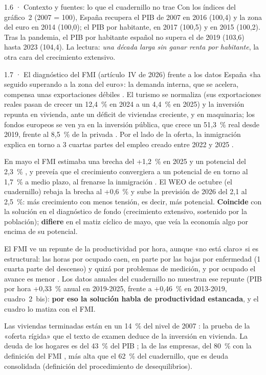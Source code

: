 \begin{complemento}{1.6 · Contexto y fuentes: lo que el cuadernillo no trae}
 Con los índices del gráfico~2 (2007 = 100), España recupera el PIB de 2007 en 2016 (100,4) y la zona del euro en 2014 (100,0); el PIB por habitante, en 2017 (100,5) y en 2015 (100,2). Tras la pandemia, el PIB por habitante español no supera el de 2019 (103,6) hasta 2023 (104,4). La lectura: \emph{una década larga sin ganar renta por habitante}, la otra cara del crecimiento extensivo.
\end{complemento}

\begin{complemento}{1.7 · El diagnóstico del FMI (artículo~IV de 2026) frente a los datos}
 España «ha seguido superando a la zona del euro»: la demanda interna, que se acelera, compensa unas exportaciones débiles . El turismo se normaliza (sus exportaciones reales pasan de crecer un 12,4~\% en 2024 a un 4,4~\% en 2025) y la inversión repunta en vivienda, ante un déficit de viviendas creciente, y en maquinaria; los fondos europeos se ven ya en la inversión pública, que crece un 51,3~\% real desde 2019, frente al 8,5~\% de la privada . Por el lado de la oferta, la inmigración explica en torno a 3 cuartas partes del empleo creado entre 2022 y 2025 .

 En mayo el FMI estimaba una brecha del +1,2~\% en 2025 y un potencial del 2,3~\% , y preveía que el crecimiento convergiera a un potencial de en torno al 1,7~\% a medio plazo, al frenarse la inmigración . El WEO de octubre (el cuadernillo) rebaja la brecha al +0,6~\% y sube la previsión de 2026 del 2,1 al 2,5~\%: más crecimiento con menos tensión, es decir, más potencial. \textbf{Coincide} con la solución en el diagnóstico de fondo (crecimiento extensivo, sostenido por la población); \textbf{difiere} en el matiz cíclico de mayo, que veía la economía algo por encima de su potencial.

 El FMI ve un repunte de la productividad por hora, aunque «no está claro» si es estructural: las horas por ocupado caen, en parte por las bajas por enfermedad (1 cuarta parte del descenso) y quizá por problemas de medición, y por ocupado el avance es menor . Los datos anuales del cuadernillo no muestran ese repunte (PIB por hora +0,33~\% anual en 2019-2025, frente a +0,46~\% en 2013-2019, cuadro~2~bis): \textbf{por eso la solución habla de productividad estancada}, y el cuadro lo matiza con el FMI.

 Las viviendas terminadas están en un 14~\% del nivel de 2007 : la prueba de la «oferta rígida» que el texto de examen deduce de la inversión en vivienda. La deuda de los hogares es del 43~\% del PIB ; la de las empresas, del 80~\% con la definición del FMI , más alta que el 62~\% del cuadernillo, que es deuda consolidada (definición del procedimiento de desequilibrios).


\end{complemento}
